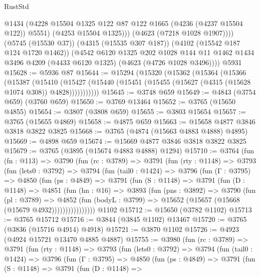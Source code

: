 \begin{lexlean}{RustStd}
\begin{coremodule}
              @1434
              (@4228 @15504 @1325 @122 @87 @122 @1665 (@4236 (@4237 @15504 @122)) @5551)
              (@4253 @15504 @1325)))
          (@4623 (@7218 @1028 @1907))))
      (@5745 (@15530 @37))
      (@4315 (@15535 @307 @187))
      (@4102 (@15542 @187 @124 @1720 @1462))
      (@4542
        @6120
        @1325
        @202
        @1028
        @144
        @11
        @1462
        @1434
        @3496
        @4209
        (@4433 @6120 @1325)
        (@4623 (@4726 @1028 @3496))))
    @5931
@15628 := @5936 @87
@15644 := @15294
    (@15320
      (@15362
        (@15364
          (@15366
            (@15387
              (@15410
                (@15427 (@15440 (@15451 (@15455 (@15627 (@4315 (@15628 @1074 @308)) @4828)))))))))))
@15645 := @3748 @659
@15649 := @4843 (@3754 @659) (@3760 @659)
@15650 := @3769 @13464
@15652 := @3765 (@15650 @4855)
@15654 := @3807 (@3808 @659)
@15655 := @3803 @15654
@15657 := @3765 (@15655 @4869)
@15658 := @4875 @659
@15663 := @15658 @4877 @3846 @3818 @3822 @3825
@15668 := @3765 (@4874 (@15663 @4883 @4888) @4895)
@15669 := @4898 @659
@15674 := @15669 @4877 @3846 @3818 @3822 @3825
@15679 := @3765 (@3895 (@15674 @4883 @4888) @1294)
@15710 := @3764
    (fun (fn : @113) =>
    @3790
      (fun (rc : @3789) =>
      @3791
        (fun (rty : @1148) =>
        @3793
          (fun (lets0 : @3792) =>
          @3794
            (fun (tail0 : @1424) =>
            @3796
              (fun (Γ : @3795) =>
              @4850
                (fun (ps : @4849) =>
                @3791
                  (fun (S : @1148) =>
                  @3791
                    (fun (D : @1148) =>
                    @4851
                      (fun (hn : @16) =>
                      @3893
                        (fun (pns : @3892) =>
                        @3790
                          (fun (pl : @3789) =>
                          @4852
                            (fun (bodyL : @3799) =>
                            @15652 (@15657 (@15668 (@15679 @4932))))))))))))))))
    @1102
@15712 := @15650 (@3782 @1102)
@15713 := @3765 @15712
@15716 := @3844 (@3845 @1102) @13467
@15720 := @3765 (@3836 (@15716 @4914) @4918)
@15721 := @3870 @1102
@15726 := @4923 (@4924 @15721 @13470 @4885 @4887)
@15755 := @3980
    (fun (rc : @3789) =>
    @3791
      (fun (rty : @1148) =>
      @3793
        (fun (lets0 : @3792) =>
        @3794
          (fun (tail0 : @1424) =>
          @3796
            (fun (Γ : @3795) =>
            @4850
              (fun (ps : @4849) =>
              @3791
                (fun (S : @1148) =>
                @3791
                  (fun (D : @1148) =>

\end{coremodule}
\end{lexlean}
